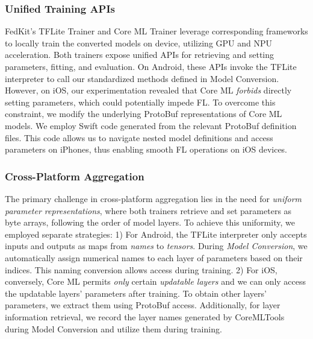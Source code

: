 \documentclass[letterpaper]{article} %
\begin{document}
\subsubsection{Unified Training APIs}
FedKit's TFLite Trainer and Core ML Trainer leverage corresponding frameworks to
locally train the converted models on device,
utilizing GPU and NPU acceleration.
Both trainers expose unified APIs for
retrieving and setting parameters,
fitting, and evaluation.
On Android, these APIs invoke the TFLite interpreter to call
our standardized methods defined in Model Conversion.
However, on iOS, our experimentation revealed that
Core ML \textit{forbids} directly setting parameters, which could potentially impede FL.
To overcome this constraint,
we modify the underlying ProtoBuf representations of
Core ML models.
We employ Swift code generated from the relevant ProtoBuf definition files. This code allows us to navigate nested model definitions and access parameters on iPhones, thus enabling smooth FL operations on iOS devices.


\subsubsection{Cross-Platform Aggregation}
The primary challenge in cross-platform aggregation lies in
the need for \textit{uniform parameter representations}, 
where both trainers retrieve and set parameters as byte arrays,
following the order of model layers.
To achieve this uniformity,  we employed separate strategies:
1) For Android, 
the TFLite interpreter only accepts inputs and outputs as maps from \textit{names} to
\textit{tensors}.
During \textit{Model Conversion},
we automatically assign numerical names to
each layer of parameters based on their indices.
This naming conversion allows access during training.
2) For iOS,
conversely, Core ML permits \textit{only} certain \textit{updatable layers} and
we can only access the updatable layers' parameters after training.
To obtain other layers' parameters,
we extract them using ProtoBuf access.
Additionally, for layer information retrieval,
we record the layer names generated by CoreMLTools during Model Conversion and
utilize them during training.
\end{document}

